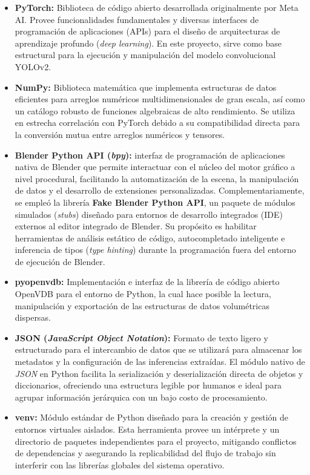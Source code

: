 \begin{itemize}
    \item \textbf{PyTorch:} Biblioteca de código abierto desarrollada originalmente por 
    Meta AI. Provee funcionalidades fundamentales y diversas interfaces 
    de programación de aplicaciones (APIs) para el diseño de arquitecturas de 
    aprendizaje profundo (\textit{deep learning}). En este proyecto, sirve como base 
    estructural para la ejecución y manipulación del modelo convolucional YOLOv2.
    \item \textbf{NumPy:} Biblioteca matemática que implementa estructuras de datos 
    eficientes para arreglos numéricos multidimensionales de gran escala, así como un 
    catálogo robusto de funciones algebraicas de alto rendimiento. Se utiliza en estrecha 
    correlación con PyTorch debido a su compatibilidad directa para la conversión mutua 
    entre arreglos numéricos y tensores.
    \item \textbf{Blender Python API (\textit{bpy}):} interfaz de programación de aplicaciones 
    nativa de Blender que permite interactuar con el núcleo del motor gráfico a nivel procedural, 
    facilitando la automatización de la escena, la manipulación de datos y el desarrollo de 
    extensiones personalizadas. Complementariamente, se empleó la librería 
    \textbf{Fake Blender Python API}, un paquete de módulos simulados 
    (\textit{stubs}) diseñado para entornos de desarrollo integrados (IDE) externos al 
    editor integrado de Blender. Su propósito es habilitar herramientas de análisis 
    estático de código, autocompletado inteligente e inferencia de tipos 
    (\textit{type hinting}) durante la programación fuera del entorno de ejecución de Blender.
    \item \textbf{pyopenvdb:} Implementación e interfaz de la librería de código abierto 
    OpenVDB para el entorno de Python, la cual hace posible la lectura, manipulación y 
    exportación de las estructuras de datos volumétricas dispersas.
    \item \textbf{JSON (\textit{JavaScript Object Notation}):} Formato de texto ligero y 
    estructurado para el intercambio de datos que se utilizará para almacenar los metadatos 
    y la configuración de las inferencias extraídas. El módulo nativo de \textit{JSON} en Python 
    facilita la serialización y deserialización directa de objetos y diccionarios, ofreciendo una 
    estructura legible por humanos e ideal para agrupar información jerárquica con un bajo 
    costo de procesamiento.
    \item \textbf{venv:} Módulo estándar de Python diseñado para la creación y gestión de 
    entornos virtuales aislados. Esta herramienta provee un intérprete y un directorio de 
    paquetes independientes para el proyecto, mitigando conflictos de dependencias y 
    asegurando la replicabilidad del flujo de trabajo sin interferir con las librerías 
    globales del sistema operativo.
\end{itemize}

